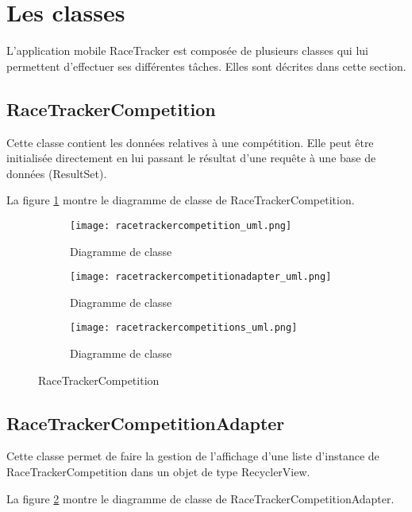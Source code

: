 \section{Les classes}

L'application mobile RaceTracker est composée de plusieurs classes qui lui permettent d'effectuer ses différentes tâches. Elles sont décrites dans cette section.

\subsection{RaceTrackerCompetition}

Cette classe contient les données relatives à une compétition. Elle peut être initialisée directement en lui passant le résultat d'une requête à une base de données (ResultSet).

La figure \ref{fig:racetrackercompetition_uml} montre le diagramme de classe de RaceTrackerCompetition.

\begin{figure}[htb!]
    \centering
    \begin{subfigure}[htb]{1\textwidth}
		\texttt{[image: racetrackercompetition\_uml.png]} 
		\caption{Diagramme de classe}
		\label{fig:racetrackercompetition_uml}
    \end{subfigure}
    \begin{subfigure}[htb]{1\textwidth}
		\texttt{[image: racetrackercompetitionadapter\_uml.png]} 
		\caption{Diagramme de classe}
		\label{fig:racetrackercompetitionadapter_uml}
    \end{subfigure}
    \begin{subfigure}[htb]{1\textwidth}
		\texttt{[image: racetrackercompetitions\_uml.png]} 
		\caption{Diagramme de classe}
		\label{fig:racetrackercompetitions_uml}
    \end{subfigure}
    \caption{RaceTrackerCompetition}\label{fig:racetrackercompetition_fig}
\end{figure}

\subsection{RaceTrackerCompetitionAdapter}

Cette classe permet de faire la gestion de l'affichage d'une liste d'instance de RaceTrackerCompetition dans un objet de type RecyclerView.

La figure \ref{fig:racetrackercompetitionadapter_uml} montre le diagramme de classe de RaceTrackerCompetitionAdapter.

